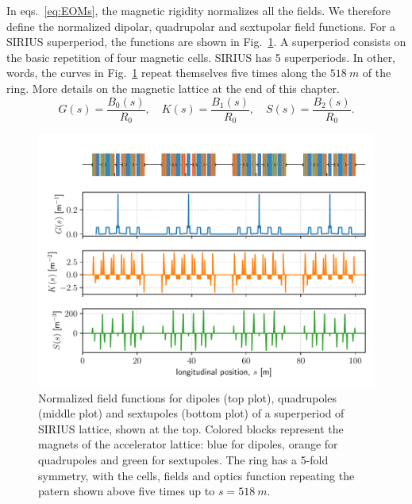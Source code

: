 In eqs.~\eqref{eq:EOMs}, the magnetic rigidity normalizes all the fields. We therefore define the normalized dipolar, quadrupolar and sextupolar field functions. For a SIRIUS superperiod, the functions are shown in Fig.~\ref{fig:field_funcs}. A superperiod consists on the basic repetition of four magnetic cells. SIRIUS has 5 superperiods. In other, words, the curves in Fig.~\ref{fig:field_funcs} repeat themselves five times along the $518~\unit{m}$ of the ring. More details on the magnetic lattice at the end of this chapter.
\begin{equation}
    G(s) = \frac{B_0(s)}{R_0}, \quad K(s) = \frac{B_1(s)}{R_0}, \quad S(s) = \frac{B_2(s)}{R_0}.
    \label{eq:mag_funcs}
\end{equation}
\begin{figure}[htb]
    \centering
    \includegraphics[width=\textwidth]{Images/field_functions.pdf}
    \caption[Normalized field functions for dipoles, quadrupoles and sextupoles of a superperiod of SIRIUS lattice]{Normalized field functions for dipoles (top plot), quadrupoles (middle plot) and sextupoles (bottom plot) of a superperiod of SIRIUS lattice, shown at the top. Colored blocks represent the magnets of the accelerator lattice: blue for dipoles, orange for quadrupoles and green for sextupoles. The ring has a 5-fold symmetry, with the cells, fields and optics function repeating the patern shown above five times up to $s=518~\unit{m}$.}
    \label{fig:field_funcs}
\end{figure}
